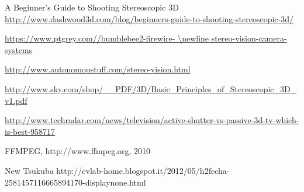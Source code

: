 
\begin{thebibliography}{99}


 A Beginner's Guide to Shooting Stereoscopic 3D \\ \url{http://www.dashwood3d.com/blog/beginners-guide-to-shooting-stereoscopic-3d/}

 \url{https://www.ptgrey.com//bumblebee2-firewire- \newline stereo-vision-camera-systems}

\url{http://www.autonomoustuff.com/stereo-vision.html}

 \url{http://www.sky.com/shop/__PDF/3D/Basic_Principles_of_Stereoscopic_3D_v1.pdf}

 \url{http://www.techradar.com/news/television/active-shutter-vs-passive-3d-tv-which-is-best-958717}


 FFMPEG, http://www.ffmpeg.org, 2010

New Tsukuba http://cvlab-home.blogspot.it/2012/05/h2fecha-2581457116665894170-displaynone.html



\end{thebibliography}
\clearpage
\thispagestyle{empty}